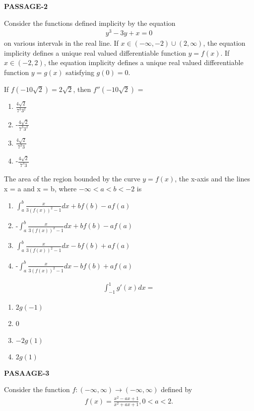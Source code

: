 \textbf{PASSAGE-2}

Consider the functions defined implicity by the equation
\begin{align}
y^3 - 3y + x = 0
\end{align}
on various intervals in the real line. If $x \in (-\infty, -2) \cup (2, \infty)$, the equation implicity defines a unique real valued differentiable function $y = f(x)$. If $x \in (-2, 2)$, the equation implicity defines a unique real valued differentiable function $y = g(x)$ satisfying $g(0) = 0$.

\item If $f(-10\sqrt{2}) = 2\sqrt{2}$, then $f''(-10\sqrt{2})$ = 
\begin{enumerate}
\item $\frac{4\sqrt{2}}{7^{3}3^{2}}$
\item -$\frac{4\sqrt{2}}{7^{3}3^{2}}$
\item $\frac{4\sqrt{2}}{7^{3}3}$
\item -$\frac{4\sqrt{2}}{7^{3}3}$
\end{enumerate}

\item The area of the region bounded by the curve $y = f(x)$, the x-axis and the lines x = a and x = b, where $-\infty < a < b < -2$ is
\begin{enumerate}
\item $\int_{a}^{b}\frac{x}{3(f(x))^2 - 1}dx + bf(b) - af(a)$
\item -$\int_{a}^{b}\frac{x}{3(f(x))^2 - 1}dx + bf(b) - af(a)$
\item $\int_{a}^{b}\frac{x}{3(f(x))^2 - 1}dx - bf(b) + af(a)$
\item -$\int_{a}^{b}\frac{x}{3(f(x))^2 - 1}dx - bf(b) + af(a)$
\end{enumerate}

\item 
\begin{align*}
\int_{-1}^{1}g'(x)dx =
\end{align*} 
\begin{enumerate}
\item $2g(-1)$
\item 0
\item $-2g(1)$
\item $2g(1)$
\end{enumerate}

\textbf{PASAAGE-3}

Consider the function $f: (-\infty, \infty) \to (-\infty, \infty)$ defined by
\begin{align*}
f(x) = \frac{x^2 - ax + 1}{x^2 + ax + 1}, 0 < a < 2.
\end{align*}


